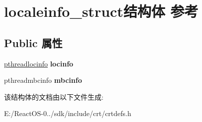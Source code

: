 \hypertarget{structlocaleinfo__struct}{}\section{localeinfo\+\_\+struct结构体 参考}
\label{structlocaleinfo__struct}
\subsection*{Public 属性}
\begin{DoxyCompactItemize}
\item 
\mbox{\label{structlocaleinfo__struct_a50492ea4f30855c5c0f5b3c55b3f2e80}} 
\hyperlink{structthreadlocaleinfostruct}{pthreadlocinfo} {\bfseries locinfo}
\item 
\mbox{\label{structlocaleinfo__struct_a51bd13b771db24a5a3a4c96def9c5567}} 
pthreadmbcinfo {\bfseries mbcinfo}
\end{DoxyCompactItemize}


该结构体的文档由以下文件生成\+:\begin{DoxyCompactItemize}
\item 
E\+:/\+React\+O\+S-\/0../sdk/include/crt/crtdefs.\+h\end{DoxyCompactItemize}

